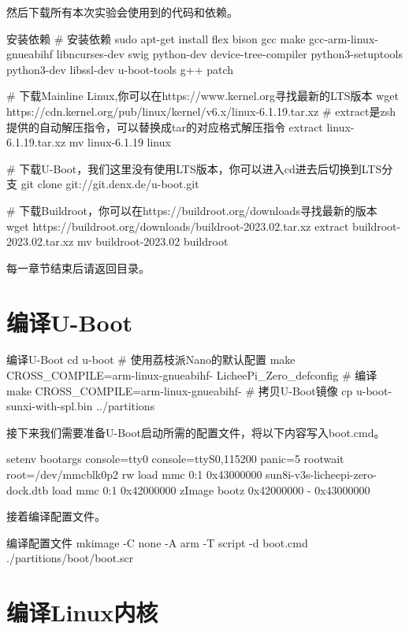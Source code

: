 \documentclass[lang=cn,newtx,10pt,scheme=chinese]{elegantbook}
\begin{document}
然后下载所有本次实验会使用到的代码和依赖。

\begin{mycode}{安装依赖}
# 安装依赖
sudo apt-get install flex bison gcc make gcc-arm-linux-gnueabihf libncurses-dev swig python-dev device-tree-compiler python3-setuptools python3-dev libssl-dev u-boot-tools g++ patch

# 下载Mainline Linux,你可以在https://www.kernel.org寻找最新的LTS版本
wget https://cdn.kernel.org/pub/linux/kernel/v6.x/linux-6.1.19.tar.xz
# extract是zsh提供的自动解压指令，可以替换成tar的对应格式解压指令
extract linux-6.1.19.tar.xz
mv linux-6.1.19 linux

# 下载U-Boot，我们这里没有使用LTS版本，你可以进入cd进去后切换到LTS分支
git clone git://git.denx.de/u-boot.git

# 下载Buildroot，你可以在https://buildroot.org/downloads寻找最新的版本
wget https://buildroot.org/downloads/buildroot-2023.02.tar.xz
extract buildroot-2023.02.tar.xz
mv buildroot-2023.02 buildroot
\end{mycode}

每一章节结束后请返回目录。

\section{编译U-Boot}

\begin{mycode}{编译U-Boot}
cd u-boot
# 使用荔枝派Nano的默认配置
make CROSS_COMPILE=arm-linux-gnueabihf- LicheePi_Zero_defconfig
# 编译
make CROSS_COMPILE=arm-linux-gnueabihf-
# 拷贝U-Boot镜像
cp u-boot-sunxi-with-spl.bin ../partitions
\end{mycode}

接下来我们需要准备U-Boot启动所需的配置文件，将以下内容写入boot.cmd。

\begin{mycode}
setenv bootargs console=tty0 console=ttyS0,115200 panic=5 rootwait root=/dev/mmcblk0p2 rw
load mmc 0:1 0x43000000 sun8i-v3s-licheepi-zero-dock.dtb
load mmc 0:1 0x42000000 zImage
bootz 0x42000000 - 0x43000000
\end{mycode}

接着编译配置文件。

\begin{mycode}{编译配置文件}
mkimage -C none -A arm -T script -d boot.cmd ./partitions/boot/boot.scr
\end{mycode}

\section{编译Linux内核}
\end{document}
